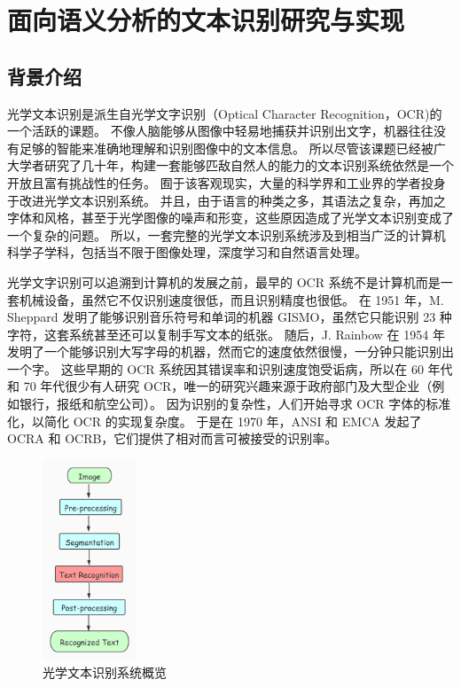
\part*{面向语义分析的文本识别研究与实现 \newline}
 
\chapter{背景介绍}
\label{chap:introduction}
光学文本识别是派生自光学文字识别（Optical Character Recognition，OCR)的一个活跃的课题。
不像人脑能够从图像中轻易地捕获并识别出文字，机器往往没有足够的智能来准确地理解和识别图像中的文本信息。
所以尽管该课题已经被广大学者研究了几十年，构建一套能够匹敌自然人的能力的文本识别系统依然是一个开放且富有挑战性的任务。
囿于该客观现实，大量的科学界和工业界的学者投身于改进光学文本识别系统。
并且，由于语言的种类之多，其语法之复杂，再加之字体和风格，甚至于光学图像的噪声和形变，这些原因造成了光学文本识别变成了一个复杂的问题。
所以，一套完整的光学文本识别系统涉及到相当广泛的计算机科学子学科，包括当不限于图像处理，深度学习和自然语言处理。

光学文字识别可以追溯到计算机的发展之前，最早的 OCR 系统不是计算机而是一套机械设备，虽然它不仅识别速度很低，而且识别精度也很低。
在 1951 年，M. Sheppard 发明了能够识别音乐符号和单词的机器 GISMO，虽然它只能识别 23 种字符，这套系统甚至还可以复制手写文本的纸张。
随后，J. Rainbow 在 1954 年发明了一个能够识别大写字母的机器，然而它的速度依然很慢，一分钟只能识别出一个字。
这些早期的 OCR 系统因其错误率和识别速度饱受诟病，所以在 60 年代和 70 年代很少有人研究 OCR，唯一的研究兴趣来源于政府部门及大型企业（例如银行，报纸和航空公司）。
因为识别的复杂性，人们开始寻求 OCR 字体的标准化，以简化 OCR 的实现复杂度。
于是在 1970 年，ANSI 和 EMCA 发起了 OCRA 和 OCRB，它们提供了相对而言可被接受的识别率。

\begin{figure}[h!]
	\centering
	\includegraphics[width=0.25\textwidth]{figure/resources/OCR_system.jpg}
	\caption{光学文本识别系统概览\label{ocr_system_overall}}
\end{figure}

